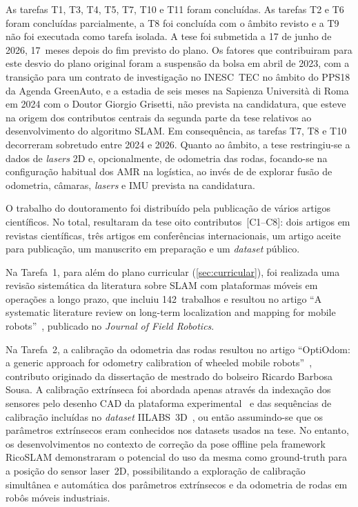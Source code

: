 \documentclass[11pt,a4paper,oneside]{article}
\newcommand{\autor}{Ricardo Barbosa Sousa}
\begin{document}
As tarefas T1, T3, T4, T5, T7, T10 e T11 foram concluídas. As tarefas T2 e T6
foram concluídas parcialmente, a T8 foi concluída com o âmbito revisto e a T9
não foi executada como tarefa isolada. A tese foi submetida a 17 de junho de
2026, 17~meses depois do fim previsto do plano.
Os fatores que contribuiram para este desvio do plano original foram a suspensão
da bolsa em abril de 2023, com a transição para um contrato de investigação no
INESC~TEC no âmbito do PPS18 da Agenda GreenAuto, e a estadia de seis meses na
Sapienza Università di Roma em 2024 com o Doutor Giorgio Grisetti, não prevista
na candidatura, que esteve na origem dos contributos centrais da segunda parte da
tese relativos ao desenvolvimento do algoritmo SLAM. Em consequência, as
tarefas T7, T8 e T10 decorreram sobretudo entre 2024 e 2026. Quanto ao âmbito,
a tese restringiu-se a dados de \textit{lasers} 2D e, opcionalmente, de
odometria das rodas, focando-se na configuração habitual dos AMR na logística,
ao invés de de explorar fusão de odometria, câmaras, \textit{lasers} e
IMU prevista na candidatura.

O trabalho do doutoramento foi distribuído pela publicação de vários artigos
científicos. No total, resultaram da tese oito contributos~[C1--C8]: dois
artigos em revistas científicas, três artigos em conferências internacionais,
um artigo aceite para publicação, um manuscrito em preparação e um
\textit{dataset} público.

Na Tarefa~1, para além do plano curricular (\autoref{sec:curricular}), foi
realizada uma revisão sistemática da literatura sobre SLAM com plataformas móveis
em operações a longo prazo, que incluiu 142~trabalhos e resultou no artigo
\enquote{A systematic literature review on long-term localization and mapping for
mobile robots}~\cite{sousa:jfr:2023}, publicado no
\textit{Journal of Field Robotics}.

Na Tarefa~2, a calibração da odometria das rodas resultou no artigo
\enquote{OptiOdom: a generic approach for odometry calibration of wheeled mobile
robots}~\cite{sousa:jint:2022}, contributo originado da dissertação de mestrado
do bolseiro \autor. A calibração extrínseca foi abordada apenas
através da indexação dos sensores pelo desenho CAD da plataforma
experimental~\cite{sousa:icarsc:2025} e das sequências de calibração incluídas
no \textit{dataset} IILABS~3D~\cite{ribeiro:dataset:2025}, ou então assumindo-se
que os parâmetros extrínsecos eram conhecidos nos datasets usados na tese.
No entanto, os desenvolvimentos no contexto de correção da pose offline pela
framework RicoSLAM demonstraram o potencial do uso da mesma como ground-truth
para a posição do sensor laser~2D, possibilitando a exploração de calibração
simultânea e automática dos parâmetros extrínsecos e da odometria de rodas em
robôs móveis industriais.
\end{document}
